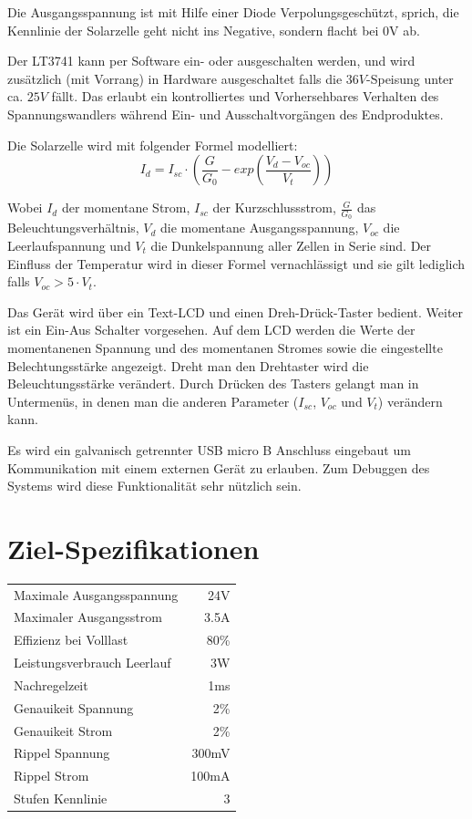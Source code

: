 \documentclass{article}
\begin{document}
Die Ausgangsspannung ist mit Hilfe einer Diode Verpolungsgesch\"utzt, sprich,
die Kennlinie der Solarzelle geht nicht ins Negative, sondern flacht bei 0V
ab.

Der LT3741 kann per Software ein- oder ausgeschalten werden, und wird
zus\"atzlich (mit Vorrang) in Hardware ausgeschaltet falls die
$36V$-Speisung unter ca. $25V$ f\"allt. Das erlaubt ein kontrolliertes und
Vorhersehbares Verhalten des Spannungswandlers w\"ahrend Ein- und
Ausschaltvorg\"angen des Endproduktes.

Die Solarzelle wird mit folgender Formel modelliert:
\begin{equation}
I_d = I_{sc} \cdot \left(\frac{G}{G_0} - exp\left(\frac{V_d-V_{oc}}{V_t}\right)\right)
\end{equation}

Wobei   $I_{d}$   der   momentane  Strom,   $I_{sc}$   der   Kurzschlussstrom,
$\frac{G}{G_0}$    das   Beleuchtungsverh\"altnis,    $V_d$   die    momentane
Ausgangsspannung, $V_{oc}$  die Leerlaufspannung und $V_t$  die Dunkelspannung
aller Zellen in Serie sind. Der Einfluss der Temperatur wird in dieser Formel
vernachl\"assigt und sie gilt lediglich falls $V_{oc} > 5 \cdot V_t$.

Das   Ger\"at  wird   \"uber  ein   Text-LCD  und   einen  Dreh-Dr\"uck-Taster
bedient. Weiter  ist  ein  Ein-Aus  Schalter vorgesehen. Auf  dem  LCD  werden
die  Werte der  momentanenen Spannung  und  des momentanen  Stromes sowie  die
eingestellte Belechtungsst\"arke angezeigt. Dreht man  den Drehtaster wird die
Beleuchtungsst\"arke ver\"andert. Durch  Dr\"ucken des Tasters gelangt  man in
Untermen\"us,  in denen  man  die anderen  Parameter  ($I_{sc}$, $V_{oc}$  und
$V_t$) ver\"andern kann.

Es wird ein galvanisch getrennter USB micro B Anschluss eingebaut um
Kommunikation mit einem externen Ger\"at zu erlauben. Zum Debuggen des Systems
wird diese Funktionalit\"at sehr n\"utzlich sein.


\section{Ziel-Spezifikationen}
\begin{center}
\begin{tabular}{lr}
    Maximale Ausgangsspannung	& 24V    \\
    Maximaler Ausgangsstrom		& 3.5A   \\
    Effizienz bei Volllast		& 80\%   \\
    Leistungsverbrauch Leerlauf	& 3W     \\
    Nachregelzeit				& 1ms    \\
    Genauikeit Spannung			& 2\%    \\
    Genauikeit Strom			& 2\%    \\
    Rippel Spannung				& 300mV  \\
    Rippel Strom				& 100mA  \\
    Stufen Kennlinie			& 3      \\
\end{tabular}
\end{center}
\end{document}
